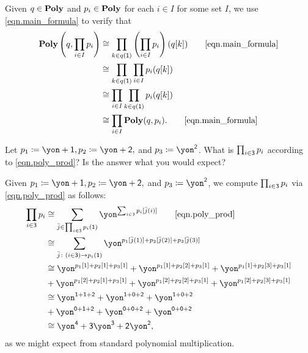 \documentclass[Book-Poly]{subfiles}
\begin{document}
\begin{exercise}
\begin{solution}
    Given $q \in \mathbf{Poly}$ and $p_i \in \mathbf{Poly}$ for each $i \in I$ for some set $I$, we use \eqref{eqn.main_formula} to verify that
    \begin{align*}
        \poly\left(q, \prod_{i \in I} p_i\right) &\iso \prod_{k \in q(\1)} \left(\prod_{i \in I} p_i\right)(q[k])
        \tag*{\eqref{eqn.main_formula}} \\
        &\iso \prod_{k \in q(\1)} \prod_{i \in I} p_i(q[k]) \\
        &\iso \prod_{i \in I} \prod_{k \in q(\1)} p_i(q[k]) \\
        &\iso \prod_{i \in I} \poly(q, p_i).
        \tag*{\eqref{eqn.main_formula}}
    \end{align*}
\end{solution}
\end{exercise}

\begin{exercise}
Let $p_1\coloneqq\yon+\1, p_2\coloneqq\yon+\2,$ and $p_3\coloneqq\yon^\2$.
What is $\prod_{i\in\textsf{3}}p_i$ according to \eqref{eqn.poly_prod}? Is the answer what you would expect?
\begin{solution}
Given $p_1\coloneqq\yon+\1,p_2\coloneqq\yon+\2,$ and $p_3\coloneqq\yon^\2$, we compute $\prod_{i\in\textsf{3}}p_i$ via \eqref{eqn.poly_prod} as follows:
\begin{align*}
    \prod_{i\in\3} p_i
    &\iso
    \sum_{\bar{j} \in \prod_{i\in\3} p_i(\1)} \yon^{\sum_{i\in\3} p_i[\bar{j}(i)]}
    \tag*{\eqref{eqn.poly_prod}} \\
    &\iso
    \sum_{\bar{j} \colon (i\in\3) \to p_i(\1)} \yon^{p_1[\bar{j}(1)] + p_2[\bar{j}(2)] + p_3[\bar{j}(3)]} \\
    &\iso
    \yon^{p_1[1] + p_2[1] + p_3[1]}
    + \yon^{p_1[1] + p_2[2] + p_3[1]}
    + \yon^{p_1[1] + p_2[3] + p_3[1]} \\
    &+ \yon^{p_1[2] + p_2[1] + p_3[1]}
    + \yon^{p_1[2] + p_2[2] + p_3[1]}
    + \yon^{p_1[2] + p_2[3] + p_3[1]} \\
    &\iso
    \yon^{\1 + \1 + \2}
    + \yon^{\1 + \0 + \2}
    + \yon^{\1 + \0 + \2} \\
    &+ \yon^{\0 + \1 + \2}
    + \yon^{\0 + \0 + \2}
    + \yon^{\0 + \0 + \2} \\
    &\iso
    \yon^\4 + \3\yon^\3 + \2\yon^\2,
\end{align*}
as we might expect from standard polynomial multiplication.
\end{solution}
\end{exercise}
\end{document}
